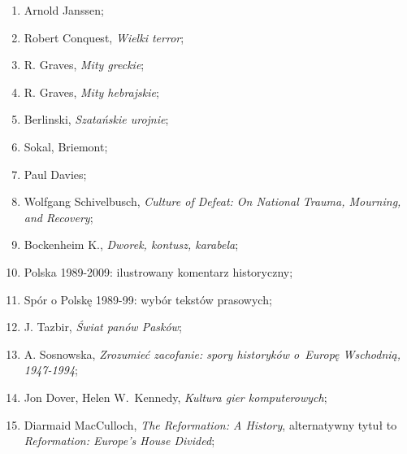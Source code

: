 \documentclass[a4paper,11pt]{article}
\begin{document}
\begin{enumerate}
\item Arnold Janssen;



\item Robert Conquest, \textit{Wielki terror};



\item R. Graves, \textit{Mity greckie};



\item R. Graves, \textit{Mity hebrajskie};



\item Berlinski, \textit{Szatańskie urojnie};



\item Sokal, Briemont;



\item Paul Davies;



\item Wolfgang Schivelbusch, \textit{Culture of Defeat: On National
    Trauma, Mourning, and Recovery};



\item Bockenheim K., \textit{Dworek, kontusz, karabela};



\item Polska 1989-2009: ilustrowany komentarz historyczny;



\item Spór o Polskę 1989-99: wybór tekstów prasowych;



\item J. Tazbir, \textit{Świat panów Pasków};



\item A. Sosnowska, \textit{Zrozumieć zacofanie: spory historyków
    o~Europę Wschodnią, 1947-1994};



\item Jon Dover, Helen W.~Kennedy, \textit{Kultura gier komputerowych};



\item Diarmaid MacCulloch, \textit{The Reformation: A History},
  alternatywny tytuł to \textit{Reformation: Europe's House Divided};




\end{enumerate}
\end{document}
